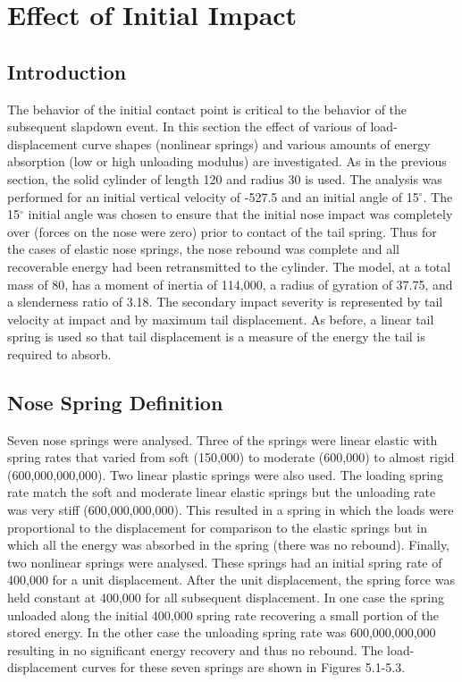 \chapter{Effect of Initial Impact}

\section{Introduction}

     The behavior of the initial contact point is critical to the
behavior of the subsequent slapdown event.  In this section the effect
of various of load-displacement curve shapes (nonlinear springs) and
various amounts of energy absorption (low or high unloading modulus)
are investigated.  As in the previous section, the solid cylinder of
length 120 and radius 30 is used.  The analysis was performed for an
initial vertical velocity of -527.5 and an initial angle of 15$^\circ$.
The 15$^\circ$ initial angle was chosen to ensure that the initial nose
impact was completely over (forces on the nose were zero) prior to
contact of the tail spring.  Thus for the cases of elastic nose
springs, the nose rebound was complete and all recoverable energy
had been retransmitted to the cylinder. The model, at a total mass of
80, has a moment of inertia of 114,000, a radius of gyration of 37.75,
and a slenderness ratio of 3.18. The secondary impact severity is
represented by tail velocity at impact and by maximum tail
displacement.  As before, a linear tail spring is used so that tail
displacement is a measure of the energy the tail is required to
absorb.

\section{Nose Spring Definition}

     Seven nose springs were analysed.  Three of the springs were
linear elastic with spring rates that varied from soft (150,000) to
moderate (600,000) to almost rigid (600,000,000,000).  Two linear
plastic springs were also used.  The loading spring rate match the
soft and moderate linear elastic springs but the unloading rate was
very stiff (600,000,000,000).  This resulted in a spring in which the
loads were proportional to the displacement for comparison to the
elastic springs but in which all the energy was absorbed in the spring
(there was no rebound).  Finally, two nonlinear springs were analysed.
These springs had an initial spring rate of 400,000 for a unit
displacement.  After the unit displacement, the spring force was held
constant at 400,000 for all subsequent displacement.  In one case the
spring unloaded along the initial 400,000 spring rate recovering a
small portion of the stored energy.  In the other case the unloading
spring rate was 600,000,000,000 resulting in no significant energy
recovery and thus no rebound.  The load-displacement curves for these
seven springs are shown in Figures 5.1-5.3.

